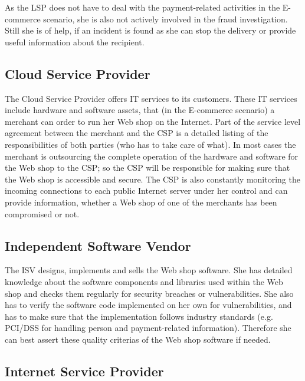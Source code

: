 As the \gls{LSP} does not have to deal with the payment-related activities in the E-commerce scenario, she is also not actively involved in the fraud investigation. Still she is of help, if an incident is found as she can stop the delivery or provide useful information about the recipient.


\subsection{Cloud Service Provider}
\label{subsec:stakeholder_csp}

The Cloud Service Provider offers IT services to its customers. These IT services include hardware and software assets, that (in the E-commerce scenario) a merchant can order to run her Web shop on the Internet. Part of the service level agreement between the merchant and the \gls{CSP} is a detailed listing of the responsibilities of both parties (who has to take care of what). In most cases the merchant is outsourcing the complete operation of the hardware and software for the Web shop to the \gls{CSP}; so the \gls{CSP} will be responsible for making sure that the Web shop is accessible and secure. The \gls{CSP} is also constantly monitoring the incoming connections to each public Internet server under her control and can provide information, whether a Web shop of one of the merchants has been compromised or not.


\subsection{Independent Software Vendor}
\label{subsec:stakeholder_isv}

The \gls{ISV} designs, implements and sells the Web shop software. She has detailed knowledge about the software components and libraries used within the Web shop and checks them regularly for security breaches or vulnerabilities. She also has to verify the software code implemented on her own for vulnerabilities, and has to make sure that the implementation follows industry standards (e.g. PCI/DSS for handling person and payment-related information). Therefore she can best assert these quality criterias of the Web shop software if needed.


\subsection{Internet Service Provider}
\label{subsec:stakeholder_isp}

